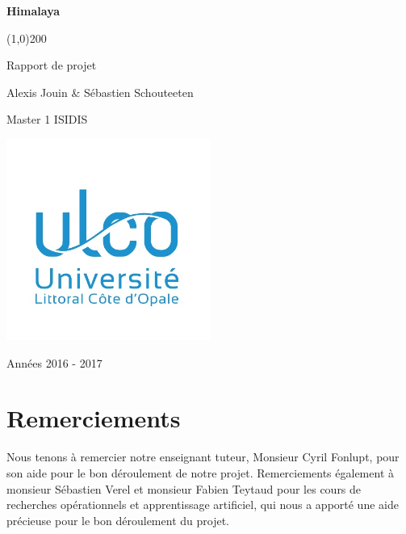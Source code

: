 \documentclass[french]{scrartcl}
\begin{document}
	
\begin{titlepage}
	\begin{center}
		\vspace*{2cm}
		
		\Huge
		\textbf{Himalaya}
		
		\line(1,0){200}
		
		\vspace{0.5cm}
		\LARGE
		Rapport de projet
		
		\vspace{4.5cm}
		
		\large
		Alexis Jouin \& Sébastien Schouteeten
		
		\vspace{0.5cm}
		Master 1 ISIDIS
		
		\vfill
		
		\includegraphics[width=0.5\textwidth]{images/ulco}
		
		\vspace{0.8cm}
		
		\Large
		Années 2016 - 2017
		
	\end{center}
\end{titlepage}

\newpage

\tableofcontents

\newpage

\section{Remerciements}
Nous tenons à remercier notre enseignant tuteur, Monsieur Cyril Fonlupt, pour son aide pour le bon déroulement de notre projet. Remerciements également à monsieur Sébastien Verel et monsieur Fabien Teytaud pour les cours de recherches opérationnels et apprentissage artificiel, qui nous a apporté une aide précieuse pour le bon déroulement du projet.
\end{document}
